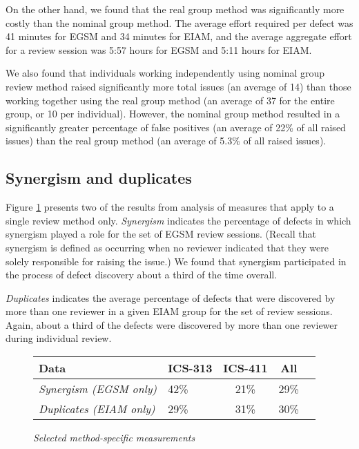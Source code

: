 On the other hand, we found that the real group method was significantly
more costly than the nominal group method.  The average effort required per
defect was 41 minutes for EGSM and 34 minutes for EIAM, and the average
aggregate effort for a review session was 5:57 hours for EGSM and 5:11
hours for EIAM.

We also found that individuals working independently using nominal group
review method raised significantly more total issues (an average of 14)
than those working together using the real group method (an average of 
37 for the entire group, or 10 per individual).
However, the nominal group method resulted in a significantly greater
percentage of false positives (an average of 22\% of all raised issues)
than the real group method (an average of 5.3\% of all raised issues).

\subsection{Synergism and duplicates}

Figure \ref{fig:individual-results} presents two of the results from
analysis of measures that apply to a single review method only.
{\em Synergism} indicates the percentage of defects in which
synergism played a role for the set of EGSM review sessions. (Recall that
synergism is defined as occurring when no reviewer indicated that they were
solely responsible for raising the issue.) We found that
synergism participated in the process of defect discovery about a third
of the time overall. 

{\em Duplicates} indicates the average percentage of defects that were
discovered by more than one reviewer in a given EIAM group for the set of
review sessions. Again, about a third of the defects were discovered by 
more than one reviewer during individual review. 

\begin{figure}[ht]
\small
  \begin{center}
  \begin{tabular}{|l|l|c|c|c|}
   \hline
Data                       & ICS-313 & ICS-411 & All \\
   \hline
{\em Synergism (EGSM only)}         & 42\%    & 21\%     & 29\% \\
{\em Duplicates (EIAM only)}      & 29\%    & 31\%     & 30\% \\
  \hline
   \end{tabular}
  \end{center}
 \caption{{\em Selected method-specific measurements}}
 \label{fig:individual-results}
\normalsize
\end{figure}

